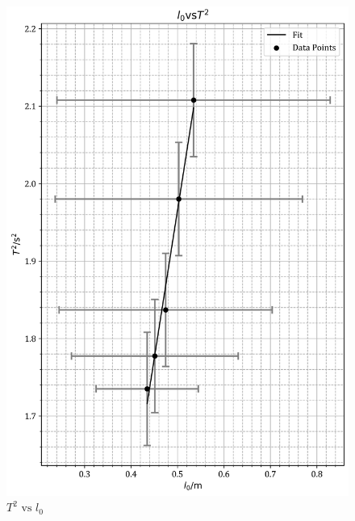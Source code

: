 \documentclass[12pt, a4paper]{article}
\begin{document}
\begin{figure}
    \centering
    \includegraphics[width=\textwidth]{Gravgraph.png}
    \caption{$T^2 \text{ vs } l_0$}
    \label{fig:gravity graph}
\end{figure}
\end{document}
